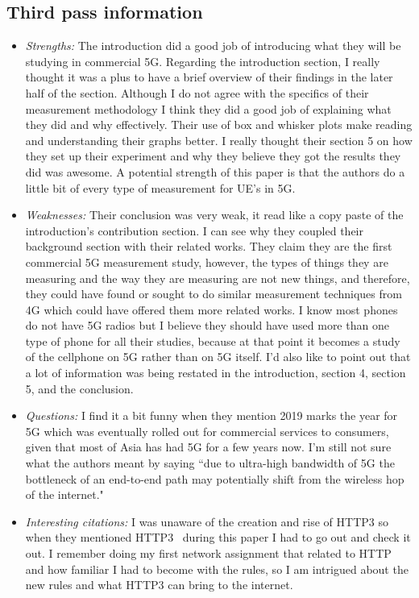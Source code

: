 \documentclass[letterpaper,twocolumn,10pt]{article}
\begin{document}
\subsection{Third pass information}
\label{sec:third}
\begin{itemize}

\item {\it Strengths:} 
The introduction did a good job of introducing what they will be studying in commercial 5G. Regarding
the introduction section, I really thought it was a plus to have a brief overview of their findings in the later half of the 
section. Although I do not agree with the specifics of their measurement methodology I think they did a good job
of explaining what they did and why effectively. Their use of box and whisker plots make reading and understanding
their graphs better. I really thought their section 5 on how they set up their experiment and why they believe they 
got the results they did was awesome. A potential strength of this paper is that the authors do a little bit of every type
of measurement for UE's in 5G.

\item {\it Weaknesses:}
Their conclusion was very weak, it read like a copy paste of the introduction's contribution section. I can see why
they coupled their background section with their related works. They claim they are the first commercial 5G 
measurement study, however, the types of things they are measuring and the way they are measuring are not 
new things, and therefore, they could have found or sought to do similar measurement techniques from 4G which 
could have offered them more related works. I know most phones do not have 5G radios but I believe they should 
have used more than one type of phone for all their studies, because at that point it becomes a study of the cellphone
on 5G rather than on 5G itself. I'd also like to point out that a lot of information was being restated in the introduction,
section 4, section 5, and the conclusion.

\item {\it Questions:}
I find it a bit funny when they mention 2019 marks the year for 5G which was eventually rolled out for commercial
services to consumers, given that most of Asia has had 5G for a few years now. I'm still not sure what the authors
meant by saying ``due to ultra-high bandwidth of 5G the bottleneck of an end-to-end path may potentially shift from
the wireless hop of the internet."

\item {\it Interesting citations:} 
I was unaware of the creation and rise of HTTP3 so when they mentioned HTTP3~\cite{http3} during this paper
I had to go out and check it out. I remember doing my first network assignment that related to HTTP and how
familiar I had to become with the rules, so I am intrigued about the new rules and what HTTP3 can bring to the
internet. 


\end{itemize}
\end{document}
